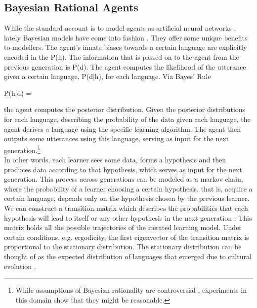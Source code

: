 \documentclass[12pt]{scrartcl}
\renewenvironment{equation}{\vspace{5mm}\begin{oldequation}}{\end{oldequation}\vspace{5mm}}
\begin{document}
\subsection*{Bayesian Rational Agents}

While the standard account is to model agents as artificial neural networks \parencite{kirby2002emergence}, lately Bayesian models have
come into fashion \parencite{perfors2011tutorial}. They offer some unique benefits to modellers.
The agent's innate biases towards a certain language are explicitly encoded in the P(h). The
information that is passed on to the agent from the previous generation is P(d). The agent
computes the likelihood of the utterance given a certain language, P(d|h), for each language. Via
Bayes' Rule

\begin{equation}
       P(h|d) = 
\end{equation}

the agent computes the posterior distribution. Given the posterior distributions for each language, describing the probability of the data given each language, the agent derives a language using the specific learning algorithm. The agent then
outputs some utterances using this language, serving as input for the next generation.\footnote{While assumptions of Bayesian rationality are controversial \parencite{marcus2013robust}, experiments in this domain \parencite{kalish2007iterated} show that they might be reasonable.}
\\

In other words, each learner sees some data, forms a hypothesis and then produces data according to that hypothesis, which serves as input for the next generation. This process across generations can be modeled as a markov chain, where the probability of a learner choosing a certain hypothesis, that is, acquire a certain language, depends only on the hypothesis chosen by the previous learner. We can construct a transition matrix which describes the probabilities that each hypothesis will lead to itself or any other hypothesis in the next generation \parencite{ferdinand2008language}. This matrix holds all the possible trajectories of the iterated learning model. 
Under certain conditions, e.g. ergodicity, the first eigenvector of the transition matrix is proportional to the stationary distribution. 
The stationary distribution can be thought of as the expected distribution of languages that emerged due to cultural evolution \parencite{kirby2007innateness}. %
\end{document}
